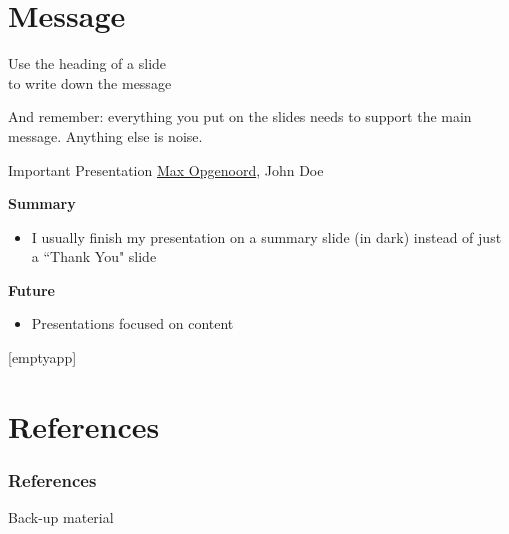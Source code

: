 \documentclass[unknownkeysallowed,aspectratio=43,10pt,onlymath]{beamer}
\begin{document}
\secimage{ }
\section{Message}

\begin{frame}{Use the heading of a slide\\ to write down the message}

And remember: everything you put on the slides needs to support the main message. Anything else is noise.


\end{frame}

\begin{framedark}[t]{Important Presentation}
\vspace{-0.025\textheight}
\textcolor{AAlb}{\underline{Max Opgenoord}, John Doe}

\vspace{0.2\textheight}

\textcolor{AAlb}{\textbf{Summary}}
\medskip
\begin{itemize}
\item[] I usually finish my presentation on a summary slide (in dark) instead of just a ``Thank You" slide
\end{itemize}
\bigskip
\textcolor{AAlb}{\textbf{Future}}
\medskip
\begin{itemize}
\item[] Presentations focused on content
\end{itemize}
\end{framedark}

\appendix
{}[emptyapp]
\section*{References}
\begin{frame}[t,allowframebreaks]
\frametitle{References}
{\scriptsize
 \printbibliography%
}
\end{frame}

\begin{frame}{Back-up material}

\end{frame}
\end{document}
